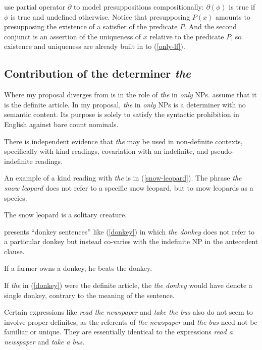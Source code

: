 \citeauthor{cb2015} use  partial operator $\partial$ to model presuppositions compositionally: $\partial(\phi)$ is true if $\phi$ is true and undefined otherwise. Notice that presupposing $P(x)$ amounts to presupposing the existence of a satisfier of the predicate $P$. And the second conjunct is an assertion of the uniqueness of $x$ relative to the predicate $P$, so existence and uniqueness are already built in to (\ref{only-lf}).

\subsection{Contribution of the determiner \textit{the}}
Where my proposal diverges from  is in the role of \textit{the} in \textit{only} NPs. \citeauthor{cb2015} assume that it is the definite article. In my proposal, \textit{the} in \textit{only} NPs is a determiner with no semantic content. Its purpose is solely to satisfy the syntactic prohibition in English against bare count nominals.

There is independent evidence that \textit{the} may be used in non-definite contexts, specifically with kind readings, covariation with an indefinite, and pseudo-indefinite readings.

An example of a kind reading with \textit{the} is in (\ref{snow-leopard}). The phrase \textit{the snow leopard} does not refer to a specific snow leopard, but to snow leopards as a species.

\begin{exe}
	\ex \label{snow-leopard} The snow leopard is a solitary creature.
\end{exe}

\citet{schwarz09} presents ``donkey sentences'' like (\ref{donkey}) in which \textit{the donkey} does not refer to a particular donkey but instead co-varies with the indefinite NP in the antecedent clause.

\begin{exe}
	\ex \label{donkey} If a farmer owns a donkey, he beats the donkey.
\end{exe}

If \textit{the} in (\ref{donkey}) were the definite article, the \textit{the donkey} would have denote a single donkey, contrary to the meaning of the sentence.

Certain expressions like \textit{read the newspaper} and \textit{take the bus} also do not seem to involve proper definites, as the referents of \textit{the newspaper} and \textit{the bus} need not be familiar or unique. They are essentially identical to the expressions \textit{read a newspaper} and \textit{take a bus}.

